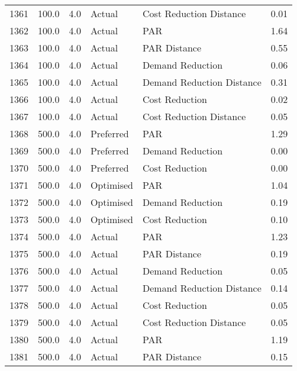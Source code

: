 \begin{longtable}{lrrllr}
1361 &        100.0 &     4.0 &         Actual &    Cost Reduction Distance &   0.01 \\
1362 &        100.0 &     4.0 &         Actual &                        PAR &   1.64 \\
1363 &        100.0 &     4.0 &         Actual &               PAR Distance &   0.55 \\
1364 &        100.0 &     4.0 &         Actual &           Demand Reduction &   0.06 \\
1365 &        100.0 &     4.0 &         Actual &  Demand Reduction Distance &   0.31 \\
1366 &        100.0 &     4.0 &         Actual &             Cost Reduction &   0.02 \\
1367 &        100.0 &     4.0 &         Actual &    Cost Reduction Distance &   0.05 \\
1368 &        500.0 &     4.0 &      Preferred &                        PAR &   1.29 \\
1369 &        500.0 &     4.0 &      Preferred &           Demand Reduction &   0.00 \\
1370 &        500.0 &     4.0 &      Preferred &             Cost Reduction &   0.00 \\
1371 &        500.0 &     4.0 &      Optimised &                        PAR &   1.04 \\
1372 &        500.0 &     4.0 &      Optimised &           Demand Reduction &   0.19 \\
1373 &        500.0 &     4.0 &      Optimised &             Cost Reduction &   0.10 \\
1374 &        500.0 &     4.0 &         Actual &                        PAR &   1.23 \\
1375 &        500.0 &     4.0 &         Actual &               PAR Distance &   0.19 \\
1376 &        500.0 &     4.0 &         Actual &           Demand Reduction &   0.05 \\
1377 &        500.0 &     4.0 &         Actual &  Demand Reduction Distance &   0.14 \\
1378 &        500.0 &     4.0 &         Actual &             Cost Reduction &   0.05 \\
1379 &        500.0 &     4.0 &         Actual &    Cost Reduction Distance &   0.05 \\
1380 &        500.0 &     4.0 &         Actual &                        PAR &   1.19 \\
1381 &        500.0 &     4.0 &         Actual &               PAR Distance &   0.15 \\

\end{longtable}
